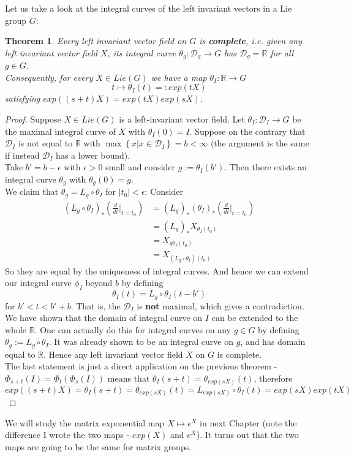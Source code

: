 \documentclass[11pt]{article}
\newtheorem{theorem}{Theorem}[section]
\newcommand{\bb}[1]{\mathbb{#1}}
\newcommand{\mc}[1]{\mathcal{#1}}
\begin{document}
Let us take a look at the integral curves of the left invariant vectors in a Lie group $G$:
\begin{theorem}
Every left invariant vector field on $G$ is \textbf{complete}, i.e. given any left invariant vector field $X$, its integral curve $\theta_g: \mc{D}_g \to G$ has $\mc{D}_g = \bb{R}$ for all $g \in G$. \\
Consequently, for every $X \in Lie(G)$ we have a map $\theta_I: \bb{R} \to G$
$$t \mapsto \theta_I(t) =: exp(tX)$$
satisfying $exp((s+t)X) = exp(tX)exp(sX)$.
\end{theorem}
\begin{proof}
Suppose $X \in Lie(G)$ is a left-invariant vector field. Let $\theta_I: \mc{D}_I \to G$ be the maximal integral curve of $X$ with $\theta_I(0) = I$. Suppose on the contrary that $\mc{D}_I$ is not equal to $\bb{R}$ with $\max\left\{x | x \in \mc{D}_I\right\} = b < \infty$ (the argument is the same if instead $\mc{D}_I$ has a lower bound).\\

Take $b' = b- \epsilon$ with $\epsilon > 0$ small and consider $g := \theta_I(b')$. Then there exists an integral curve $\theta_g$ with $\theta_g(0) = g$.\\
We claim that $\theta_g = L_g \circ \theta_I$ for $|t_0| < \epsilon$: Consider
\begin{align*}
(L_g \circ \theta_I)_*(\frac{d}{dt}|_{t=t_0}) &= (L_g)_* (\theta_I)_*(\frac{d}{dt}|_{t=t_0})\\
&= (L_g)_*X_{\theta_I(t_0)}\\
&= X_{g\theta_I(t_0)} \\
&= X_{(L_g \circ \theta_I)(t_0)}
\end{align*}
So they are equal by the uniqueness of integral curves. And hence we can extend our integral curve $\phi_I$ beyond $b$ by defining
$$\theta_I(t) = L_g \circ \theta_I(t - b')$$
for $b' < t < b'+b$. That is, the $\mc{D}_I$ is \textbf{not} maximal, which gives a contradiction.\\
We have shown that the domain of integral curve on $I$ can be extended to the whole $\bb{R}$. One can actually do this for integral curves on any $g \in G$ by defining $\theta_g := L_g \circ \theta_I$. It was already shown to be an integral curve on $g$, and has domain equal to $\bb{R}$. Hence any left invariant vector field $X$ on $G$ is complete.\\
The last statement is just a direct application on the previous theorem - $\Phi_{s+t}(I) = \Phi_t (\Phi_s(I))$ means that $\theta_I(s+t) = \theta_{exp(sX)}(t)$, therefore
$$exp((s+t)X)= \theta_I(s+t) = \theta_{exp(sX)}(t) = L_{exp(sX)} \circ \theta_I(t) = exp(sX)exp(tX)$$
\end{proof}
We will study the matrix exponential map $X \mapsto e^X$ in next Chapter (note the difference I wrote the two maps - $exp(X)$ and $e^X$). It turns out that the two maps are going to be the same for matrix groups.\\
\end{document}
